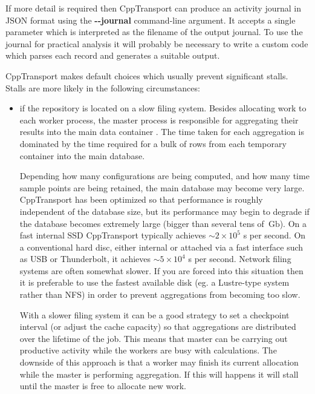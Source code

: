 \documentclass[11pt,a4paper]{article}
\renewcommand{\texttt}[1]{{\ttfamily\fontseries{l}\selectfont{#1}}}
\newcommand{\packagefont}{\sffamily}
\newcommand{\CppTransport}{{\packagefont CppTransport}}
\newcommand{\file}[1]{\texttt{{#1}}}
\newcommand{\option}[1]{{\ttfamily\bfseries\small #1}}
\newcommand{\Gb}{\,\mathrm{Gb}}
\newcommand{\semibold}[1]{{\fontseries{b}\selectfont{#1}}}
\newcommand{\para}[1]{\par\vspace{2mm}\noindent\semibold{{#1.}---}\ignorespaces}
\begin{document}
If more detail is required then {\CppTransport} can produce an activity
journal in JSON format using the
\option{{-}{-}journal} command-line argument.
It accepts a single parameter which is interpreted as the filename of the
output journal.
To use the journal for practical analysis it will probably be necessary
to write a custom code which parses each record and generates a suitable output.

\para{Avoiding stalls}
{\CppTransport} makes default choices which usually prevent significant stalls.
Stalls are more likely in the following circumstances:
\begin{itemize}
    \item if the repository is located on a slow filing system.
    Besides allocating work to each worker process, the master process is
    responsible for aggregating their results into the main data container
    \file{data.sqlite}.
    The time taken for each aggregation is dominated by the time required
    for a bulk \texttt{INSERT} of rows from each temporary container
    into the main database.
    
    Depending how many configurations are being computed, and how many time
    sample points are being retained,
    the main database may become very large.
    {\CppTransport} has been optimized so that
    \texttt{INSERT} performance is roughly independent of the database
    size,
    but its performance may begin to degrade if the database becomes extremely
    large (bigger than several tens of $\Gb$).
    On a fast internal SSD
    {\CppTransport} typically achieves $\sim 2\times 10^5$
    \texttt{INSERT}s per second.
    On a conventional hard disc, either internal or attached via a fast interface
    such as USB or Thunderbolt,
    it achieves $\sim 5 \times 10^4$
    \texttt{INSERT}s per second.
    Network filing systems are often somewhat slower.
    If you are forced into this situation then it is preferable
    to use the fastest available disk
    (eg. a Lustre-type system rather than NFS)
    in order to prevent aggregations from becoming too slow.
    
    With a slower filing system it can be a good strategy to
    set a checkpoint interval (or adjust the cache capacity)
    so that aggregations are distributed over the lifetime of the job.
    This means that master can be carrying out productive activity while the
    workers are busy with calculations.
    The downside of this approach is that a worker may finish its current
    allocation while the master is performing aggregation.
    If this will happens it will stall until the master is free to
    allocate new work.
    

\end{itemize}
\end{document}
